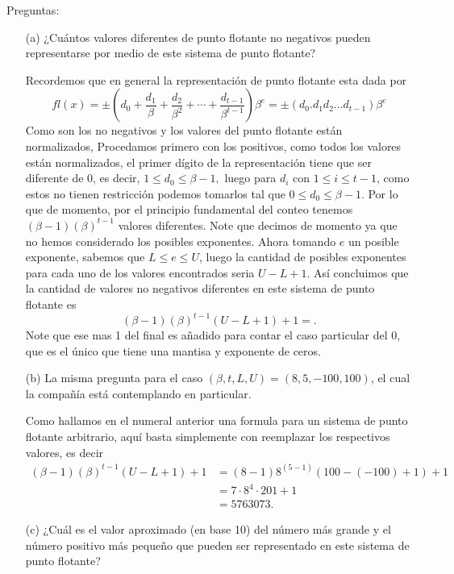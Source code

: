 \documentclass[12pt, a4paper]{article}%
\begin{document}
Preguntas:
\begin{itemize}
    \item[(a)] ¿Cuántos valores diferentes de punto flotante no negativos pueden representarse por medio de este sistema de punto flotante?
    \begin{solution}
    Recordemos que en general la representación de punto flotante esta dada por
    $$fl(x)=\pm\left(d_0+\frac{d_1}{\beta}+\frac{d_2}{\beta^2}+\cdots+\frac{d_{t-1}}{\beta^{t-1}}\right)\beta^e=\pm(d_0.d_1d_2\dots d_{t-1})\beta^e$$
     Como son los no negativos y los valores del punto flotante están normalizados, Procedamos primero con los positivos, como todos los valores están normalizados, el primer dígito de la representación tiene que ser diferente de 0, es decir, $1\leq d_0\leq \beta-1,$ luego para $d_i$ con $1\leq i\leq t-1$, como estos no tienen restricción podemos tomarlos tal que $0\leq d_0\leq \beta-1.$ Por lo que de momento, por el principio fundamental del conteo tenemos $(\beta-1)(\beta)^{t-1}$ valores diferentes. Note que decimos de momento ya que no hemos considerado los posibles exponentes. Ahora tomando $e$ un posible exponente, sabemos que $L\leq e\leq U$, luego la cantidad de posibles exponentes para cada uno de los valores encontrados seria $U-L+1.$ Así concluimos que la cantidad de valores no negativos diferentes en este sistema de punto flotante es
     $$(\beta-1)(\beta)^{t-1}(U-L+1)+1=.$$
     Note que ese mas 1 del final es añadido para contar el caso particular del 0, que es el único que tiene una mantisa y exponente de ceros.
    \end{solution}
    \item[(b)] La misma pregunta para el caso \( (\beta, t, L, U) = (8, 5, -100, 100) \), el cual la compañía está contemplando en particular.
    \begin{solution}
        Como hallamos en el numeral anterior una formula para un sistema de punto flotante arbitrario, aquí basta simplemente con reemplazar los respectivos valores, es decir
        \begin{align*}
           (\beta-1)(\beta)^{t-1}(U-L+1)+1&=(8-1)8^{(5-1)}(100-(-100)+1)+1\\
           &=7\cdot 8^4\cdot201+1\\
           &=5763073.
        \end{align*}
    \end{solution}
    \item[(c)] ¿Cuál es el valor aproximado (en base 10) del número más grande y el número positivo más pequeño que pueden ser representado en este sistema de punto flotante?

\end{itemize}
\end{document}
